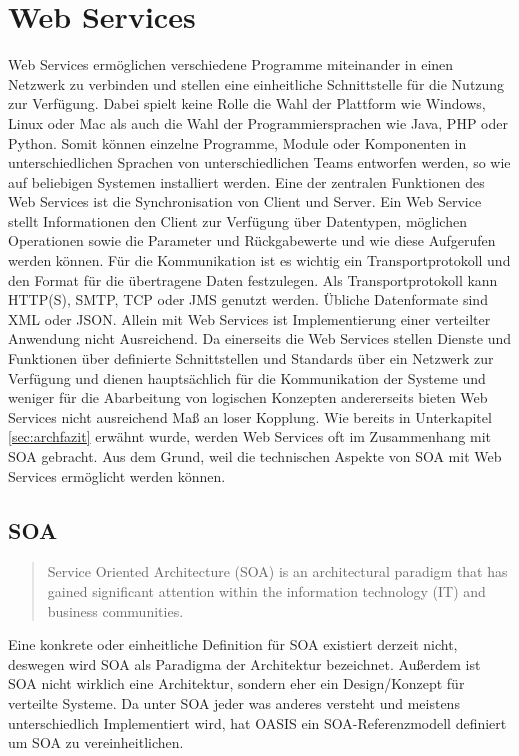 \section{Web Services}
\label{sec:webservices}
Web Services ermöglichen verschiedene Programme miteinander in einen Netzwerk zu verbinden und stellen eine einheitliche Schnittstelle für die Nutzung zur Verfügung. Dabei spielt keine Rolle die Wahl der Plattform wie Windows, Linux oder Mac als auch die Wahl der Programmiersprachen wie Java, PHP oder Python. Somit können einzelne Programme, Module oder Komponenten in unterschiedlichen Sprachen von unterschiedlichen Teams entworfen werden, so wie auf beliebigen Systemen installiert werden. Eine der zentralen Funktionen des Web Services ist die Synchronisation von Client und Server. Ein Web Service stellt Informationen den Client zur Verfügung über Datentypen, möglichen Operationen sowie die Parameter und Rückgabewerte und wie diese Aufgerufen werden können. Für die Kommunikation ist es wichtig ein Transportprotokoll und den Format für die übertragene Daten festzulegen. Als Transportprotokoll kann HTTP(S), SMTP, TCP oder JMS genutzt werden. Übliche Datenformate sind XML oder JSON. Allein mit Web Services ist Implementierung einer verteilter Anwendung nicht Ausreichend. Da einerseits die Web Services stellen Dienste und Funktionen über definierte Schnittstellen und Standards über ein Netzwerk zur Verfügung und dienen hauptsächlich für die Kommunikation der Systeme und weniger für die Abarbeitung von logischen Konzepten andererseits bieten Web Services nicht ausreichend Maß an loser Kopplung. Wie bereits in Unterkapitel \ref{sec:archfazit} erwähnt wurde, werden Web Services oft im Zusammenhang mit SOA gebracht.
Aus dem Grund, weil die technischen Aspekte von SOA mit Web Services ermöglicht werden können.

\subsection{SOA}
\begin{quote}
Service Oriented Architecture (SOA) is an architectural paradigm that has gained significant attention within the information technology (IT) and business communities.
\end{quote}
Eine konkrete oder einheitliche Definition für SOA existiert derzeit nicht,
 deswegen wird SOA als Paradigma der Architektur bezeichnet. Außerdem ist SOA nicht wirklich eine Architektur, sondern eher ein Design/Konzept für verteilte Systeme. 
Da unter SOA jeder was anderes versteht und meistens unterschiedlich Implementiert wird, hat OASIS ein SOA-Referenzmodell definiert um SOA zu vereinheitlichen.

